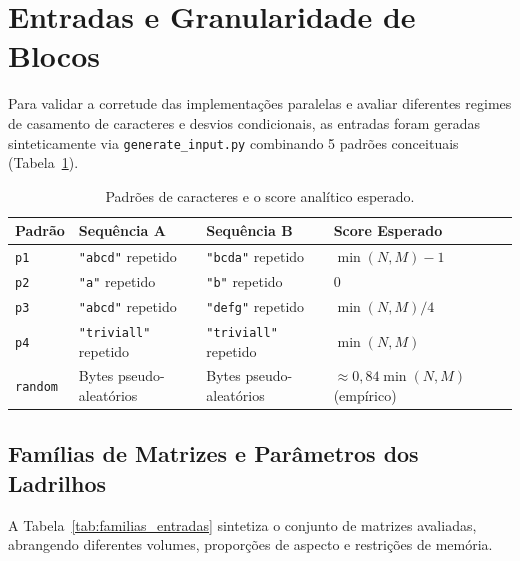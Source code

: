 \section{Entradas e Granularidade de Blocos}
\label{sec:entradas}

Para validar a corretude das implementações paralelas e avaliar diferentes regimes de casamento de caracteres e desvios condicionais, as entradas foram geradas sinteticamente via \texttt{generate\_input.py} combinando 5 padrões conceituais (Tabela~\ref{tab:padroes}).

\begin{table}[H]
\centering
\small
\caption{Padrões de caracteres e o score analítico esperado.}
\label{tab:padroes}
\begin{tabular}{@{}llll@{}}
\toprule
\textbf{Padrão} & \textbf{Sequência A} & \textbf{Sequência B} & \textbf{Score Esperado} \\ \midrule
\texttt{p1} & \texttt{"abcd"} repetido & \texttt{"bcda"} repetido & $\min(N,M) - 1$ \\
\texttt{p2} & \texttt{"a"} repetido & \texttt{"b"} repetido & $0$ \\
\texttt{p3} & \texttt{"abcd"} repetido & \texttt{"defg"} repetido & $\min(N,M)/4$ \\
\texttt{p4} & \texttt{"triviall"} repetido & \texttt{"triviall"} repetido & $\min(N,M)$ \\
\texttt{random} & Bytes pseudo-aleatórios & Bytes pseudo-aleatórios & $\approx 0{,}84 \min(N,M)$ (empírico) \\ \bottomrule
\end{tabular}
\end{table}

\subsection{Famílias de Matrizes e Parâmetros dos Ladrilhos}

A Tabela~\ref{tab:familias_entradas} sintetiza o conjunto de matrizes avaliadas, abrangendo diferentes volumes, proporções de aspecto e restrições de memória.

